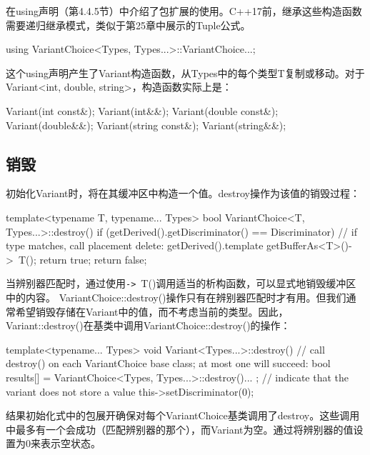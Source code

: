 \begin{notice}
在using声明（第4.4.5节）中介绍了包扩展的使用。C++17前，继承这些构造函数需要递归继承模式，类似于第25章中展示的Tuple公式。
\end{notice}

\begin{cpp}
using VariantChoice<Types, Types...>::VariantChoice...;
\end{cpp}

这个using声明产生了Variant构造函数，从Types中的每个类型T复制或移动。对于Variant<int, double, string>，构造函数实际上是：

\begin{cpp}
Variant(int const&);
Variant(int&&);
Variant(double const&);
Variant(double&&);
Variant(string const&);
Variant(string&&);
\end{cpp}

\subsection{销毁}

初始化Variant时，将在其缓冲区中构造一个值。destroy操作为该值的销毁过程：

\begin{cpp}
template<typename T, typename... Types>
bool VariantChoice<T, Types...>::destroy() {
	if (getDerived().getDiscriminator() == Discriminator) {
		// if type matches, call placement delete:
		getDerived().template getBufferAs<T>()->~T();
		return true;
	}
	return false;
}
\end{cpp}

当辨别器匹配时，通过使用\texttt{->}~T()调用适当的析构函数，可以显式地销毁缓冲区中的内容。 
VariantChoice::destroy()操作只有在辨别器匹配时才有用。但我们通常希望销毁存储在Variant中的值，而不考虑当前的类型。因此，Variant::destroy()在基类中调用VariantChoice::destroy()的操作：

\begin{cpp}
template<typename... Types>
void Variant<Types...>::destroy() {
	// call destroy() on each VariantChoice base class; at most one will succeed:
	bool results[] = {
		VariantChoice<Types, Types...>::destroy()...
	};
	// indicate that the variant does not store a value
	this->setDiscriminator(0);
}
\end{cpp}

结果初始化式中的包展开确保对每个VariantChoice基类调用了destroy。这些调用中最多有一个会成功（匹配辨别器的那个），而Variant为空。通过将辨别器的值设置为0来表示空状态。

